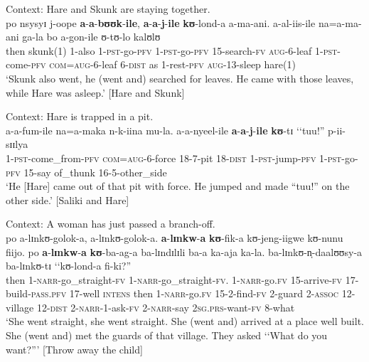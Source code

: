 \begin{exe}
\ex \label{exJaFollowingBuuka2}
Context: Hare and Skunk are staying together.\\
\gll po nsysyɪ j-oope \textbf{a}-\textbf{a}-\textbf{bʊʊk}-\textbf{ile}, \textbf{a}-\textbf{a}-\textbf{j}-\textbf{ile} \textbf{kʊ}-lond-a a-ma-ani. a-al-iis-ile na=a-ma-ani ga-la bo a-gon-ile ʊ-tʊ-lo kalʊlʊ\\
then skunk(1) 1-also 1-\textsc{pst}-go-\textsc{pfv} 1-\textsc{pst}-go-\textsc{pfv} 15-search-\textsc{fv} \textsc{aug}-6-leaf 1-\textsc{pst}-come-\textsc{pfv} \textsc{com}=\textsc{aug}-6-leaf 6-\textsc{dist} as 1-rest-\textsc{pfv} \textsc{aug}-13-sleep hare(1)\\
\glt `Skunk also went, he (went and) searched for leaves. He came with those leaves, while Hare was asleep.' [Hare and Skunk]

\ex \label{exJaNyeela}
Context: Hare is trapped in a pit.\\
\gll a-a-fum-ile na=a-maka n-k-iina mu-la. a-a-nyeel-ile \textbf{a}-\textbf{a}-\textbf{j}-\textbf{ile} \textbf{kʊ}-tɪ \textup{\lq\lq}tuu!\textup{''} p-ii-sɪɪlya\\ 
1-\textsc{pst}-come\_from-\textsc{pfv} \textsc{com}=\textsc{aug}-6-force 18-7-pit 18-\textsc{dist} 1-\textsc{pst}-jump-\textsc{pfv} 1-\textsc{pst}-go-\textsc{pfv} 15-say \phantom{\lq\lq}of\_thunk 16-5-other\_side\\
\glt `He [Hare] came out of that pit with force. He jumped and made ``tuu!'' on the other side.' [Saliki and Hare]

\ex\label{exjafika}
Context: A woman has just passed a branch-off.\\
\gll po a-lɪnkʊ-golok-a, a-lɪnkʊ-golok-a. \textbf{a}-\textbf{lɪnkw}-\textbf{a} \textbf{kʊ}-fik-a kʊ-jeng-iigwe kʊ-nunu fiijo. po \textbf{a}-\textbf{lɪnkw}-\textbf{a} \textbf{kʊ}-ba-ag-a ba-lɪndɪlɪli ba-a ka-aja ka-la. ba-lɪnkʊ-n̩-daalʊʊsy-a ba-lɪnkʊ-tɪ \textup{\lq\lq}kʊ-lond-a fi-ki?\textup{''}\\
then 1-\textsc{narr}-go\_straight-\textsc{fv} 1-\textsc{narr}-go\_straight-\textsc{fv}. 1-\textsc{narr}-go.\textsc{fv} 15-arrive-\textsc{fv} 17-build-\textsc{pass.pfv} 17-well \textsc{intens} then 1-\textsc{narr}-go.\textsc{fv} 15-2-find-\textsc{fv} 2-guard 2-\textsc{assoc} 12-village 12-\textsc{dist} 2-\textsc{narr}-1-ask-\textsc{fv} 2-\textsc{narr}-say \phantom{\lq\lq}\textsc{2sg.prs}-want-\textsc{fv} 8-what\\
\glt \lq She went straight, she went straight. She (went and) arrived at a place well built. She (went and) met the guards of that village. They asked \lq\lq What do you want?''{}' [Throw away the child]
\end{exe}


